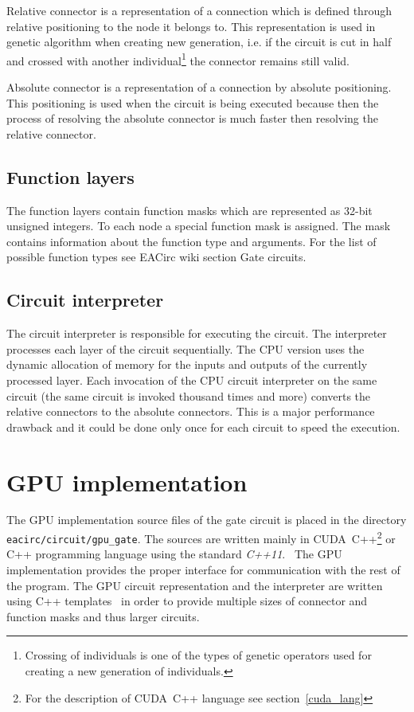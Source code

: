 \documentclass[12pt,oneside]{fithesis2}
\begin{document}
Relative connector is a representation of a connection which is defined through relative positioning to the node it belongs to. This representation is used in genetic algorithm when creating new generation, i.e. if the circuit is cut in half and crossed with another individual\footnote{Crossing of individuals is one of the types of genetic operators used for creating a new generation of individuals.} the connector remains still valid.

Absolute connector is a representation of a connection by absolute positioning. This positioning is used when the circuit is being executed because then the process of resolving the absolute connector is much faster then resolving the relative connector.

\subsection{Function layers}

The function layers contain function masks which are represented as 32-bit unsigned integers. To each node a special function mask is assigned. The mask contains information about the function type and arguments. For the list of possible function types see EACirc wiki section Gate circuits.~\cite{eacirc_circuit}

\subsection{Circuit interpreter}

The circuit interpreter is responsible for executing the circuit. The interpreter processes each layer of the circuit sequentially. The CPU version uses the dynamic allocation of memory for the inputs and outputs of the currently processed layer. Each invocation of the CPU circuit interpreter on the same circuit (the same circuit is invoked thousand times and more) converts the relative connectors to the absolute connectors. This is a major performance drawback and it could be done only once for each circuit to speed the execution.


\section{GPU implementation}

The GPU implementation source files of the gate circuit is placed in the directory \texttt{eacirc/circuit/gpu\_gate}. The sources are written mainly in CUDA~C++\footnote{For the description of CUDA~C++ language see section~\ref{cuda_lang}} or C++ programming language using the standard \emph{C++11}.~\cite{std_c++11, cuda_guide} The GPU implementation provides the proper interface for communication with the rest of the program. The GPU circuit representation and the interpreter are written using C++ templates~\cite{std_c++11} in order to provide multiple sizes of connector and function masks and thus larger circuits.
\end{document}
